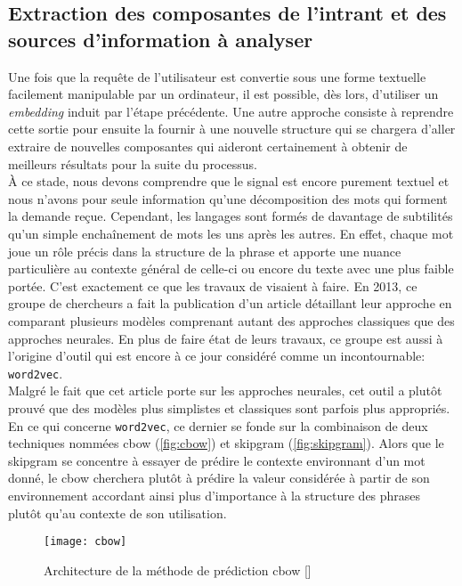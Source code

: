 \subsection{Extraction des composantes de l'intrant et des sources d'information à analyser}
\label{devel:embedding}
Une fois que la requête de l'utilisateur est convertie sous une forme textuelle facilement manipulable par un ordinateur, il est possible, dès lors, d'utiliser un \textit{embedding} induit par l'étape précédente. Une autre approche consiste à reprendre cette sortie pour ensuite la fournir à une nouvelle structure qui se chargera d'aller extraire de nouvelles composantes qui aideront certainement à obtenir de meilleurs résultats pour la suite du processus. \\

À ce stade, nous devons comprendre que le signal est encore purement textuel et nous n'avons pour seule information qu'une décomposition des mots qui forment la demande reçue. Cependant, les langages sont formés de davantage de subtilités qu'un simple enchaînement de mots les uns après les autres. En effet, chaque mot joue un rôle précis dans la structure de la phrase et apporte une nuance particulière au contexte général de celle-ci ou encore du texte avec une plus faible portée. C'est exactement ce que les travaux de \cite{word2vec} visaient à faire. En 2013, ce groupe de chercheurs a fait la publication d'un article détaillant leur approche en comparant plusieurs modèles comprenant autant des approches classiques que des approches neurales. En plus de faire état de leurs travaux, ce groupe est aussi à l'origine d'outil qui est encore à ce jour considéré comme un incontournable: \texttt{word2vec}. \\

Malgré le fait que cet article porte sur les approches neurales, cet outil a plutôt prouvé que des modèles plus simplistes et classiques sont parfois plus appropriés. En ce qui concerne \texttt{word2vec}, ce dernier se fonde sur la combinaison de deux techniques nommées \gls{cbow} (\autoref{fig:cbow}) et \gls{skipgram} (\autoref{fig:skipgram}). Alors que le \gls{skipgram} se concentre à essayer de prédire le contexte environnant d'un mot donné, le \gls{cbow} cherchera plutôt à prédire la valeur considérée à partir de son environnement accordant ainsi plus d’importance à la structure des phrases plutôt qu’au contexte de son utilisation.\\

\begin{figure}[ht]
  \centering
  \texttt{[image: cbow]}
  \caption{Architecture de la méthode de prédiction \gls{cbow} []}
  \label{fig:cbow}
\end{figure}

